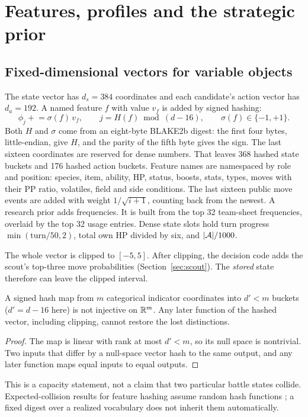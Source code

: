 \section{Features, profiles and the strategic prior}
\label{sec:features}

\historyscope

\subsection{Fixed-dimensional vectors for variable objects}
The state vector has $d_s=384$ coordinates and each candidate's action vector
has $d_a=192$. A named feature $f$ with value $v_f$ is added by signed hashing:
\begin{equation}
  \phi_j \mathrel{+}=\sigma(f)\,v_f,\qquad
  j=H(f)\bmod(d-16),\qquad \sigma(f)\in\{-1,+1\}.
\end{equation}
Both $H$ and $\sigma$ come from an eight-byte BLAKE2b digest: the first four
bytes, little-endian, give $H$, and the parity of the fifth byte gives the
sign. The last sixteen coordinates are reserved for dense numbers. That
leaves 368 hashed state buckets and 176 hashed action buckets. Feature names
are namespaced by role and position: species, item, ability, HP, status,
boosts, stats, types, moves with their PP ratio, volatiles, field and side
conditions. The last sixteen public move events are added with weight
$1/\sqrt{i+1}$, counting back from the newest. A research prior adds
 frequencies. It is built from the top 32 team-sheet
frequencies, overlaid by the top 32 usage entries. Dense state slots hold turn
progress $\min(\text{turn}/50,2)$, total own HP divided by six, and
$|\mathcal{A}|/1000$.

The whole vector is clipped to $[-5,5]$. After clipping, the decision code
adds the scout's top-three move probabilities
(Section~\ref{sec:scout}). The \emph{stored} state therefore can leave the
clipped interval.

\begin{proposition}
\label{prop:hash}
A signed hash map from $m$ categorical indicator coordinates into $d'<m$
buckets ($d'=d-16$ here) is not injective on $\mathbb{R}^m$. Any later function of the
hashed vector, including clipping, cannot restore the lost distinctions.
\end{proposition}
\begin{proof}
The map is linear with rank at most $d'<m$, so its null space is nontrivial.
Two inputs that differ by a null-space vector hash to the same output, and
any later function maps equal inputs to equal outputs.
\end{proof}
This is a capacity statement, not a claim that two particular battle states
collide. Expected-collision results for feature hashing assume random hash
functions \citep{featurehashing}; a fixed digest over a realized vocabulary
does not inherit them automatically.

